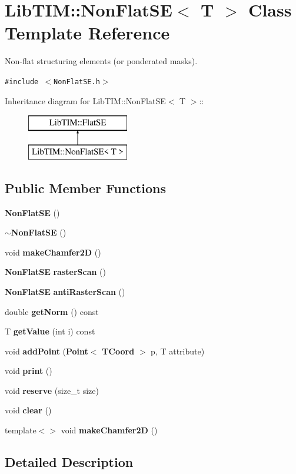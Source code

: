 \section{Lib\-TIM::Non\-Flat\-SE$<$ T $>$ Class Template Reference}
\label{classLibTIM_1_1NonFlatSE}
Non-flat structuring elements (or ponderated masks).  


{\tt \#include $<$Non\-Flat\-SE.h$>$}

Inheritance diagram for Lib\-TIM::Non\-Flat\-SE$<$ T $>$::\begin{figure}[H]
\begin{center}
\leavevmode
\includegraphics[height=2cm]{classLibTIM_1_1NonFlatSE}
\end{center}
\end{figure}
\subsection*{Public Member Functions}
\begin{CompactItemize}
\item 
{\bf Non\-Flat\-SE} ()
\item 
{\bf $\sim$Non\-Flat\-SE} ()
\item 
void {\bf make\-Chamfer2D} ()
\item 
{\bf Non\-Flat\-SE} {\bf raster\-Scan} ()
\item 
{\bf Non\-Flat\-SE} {\bf anti\-Raster\-Scan} ()
\item 
double {\bf get\-Norm} () const 
\item 
T {\bf get\-Value} (int i) const 
\item 
void {\bf add\-Point} ({\bf Point}$<$ {\bf TCoord} $>$ p, T attribute)
\item 
void {\bf print} ()
\item 
void {\bf reserve} (size\_\-t size)
\item 
void {\bf clear} ()
\item 
template$<$$>$ void {\bf make\-Chamfer2D} ()
\end{CompactItemize}


\subsection{Detailed Description}
